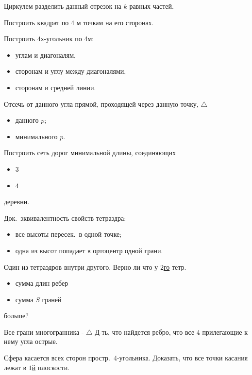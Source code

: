 \documentclass{article}
\begin{document}
\problem  %
Циркулем разделить данный отрезок на $k$ равных частей.


\problem  %
Построить квадрат по $4$ м точкам на его сторонах.


\problem  %
Построить $4$х-угольник по 4м:
\begin{itemize}
  \item[а)] углам и диагоналям,
  \item[б)] сторонам и углу между диагоналями,
  \item[в)] сторонам и средней линии.
\end{itemize}


\problem  %
Отсечь от данного угла прямой, проходящей через данную точку, $\triangle$
\begin{itemize}
  \item[а)] данного $p$;
  \item[б)] минимального $p$.
\end{itemize}


\problem  %
Построить сеть дорог минимальной длины, соединяющих
\begin{itemize}
  \item[а)] $3$
  \item[б)] $4$
\end{itemize}
деревни.


\setcounter{problemcounter}{47}


\problem  %
Док.\ эквивалентность свойств тетраэдра:
\begin{itemize}
  \item[а)] все высоты пересек.\ в одной точке;
  \item[б)] одна из высот попадает в ортоцентр одной грани.
\end{itemize}


\problem  %
Один из тетраэдров внутри другого.
Верно ли что у $2$\underline{го} тетр.
\begin{itemize}
  \item[а)] сумма длин ребер
  \item[б)] сумма $S$ граней
\end{itemize}
больше?


\problem  %
Все грани многогранника - $\triangle$
Д-ть, что найдется ребро, что все $4$ прилегающие к нему угла острые.


\problem  %
Сфера касается всех сторон простр.\ $4$-угольника.
Доказать, что все точки касания лежат в $1$\underline{й} плоскости.
\end{document}
